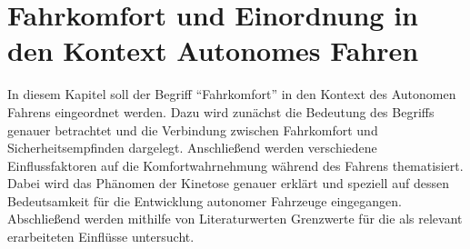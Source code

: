 \chapter{Fahrkomfort und Einordnung in den Kontext Autonomes Fahren}\label{cha:Komfort}
In diesem Kapitel soll der Begriff ``Fahrkomfort'' in den Kontext des Autonomen Fahrens eingeordnet werden. Dazu wird zunächst die Bedeutung des Begriffs genauer betrachtet und die Verbindung zwischen Fahrkomfort und Sicherheitsempfinden dargelegt. Anschließend werden verschiedene Einflussfaktoren auf die Komfortwahrnehmung während des Fahrens thematisiert. Dabei wird das Phänomen der Kinetose genauer erklärt und speziell auf dessen Bedeutsamkeit für die Entwicklung autonomer Fahrzeuge eingegangen. Abschließend werden mithilfe von Literaturwerten Grenzwerte für die als relevant erarbeiteten Einflüsse untersucht. 

